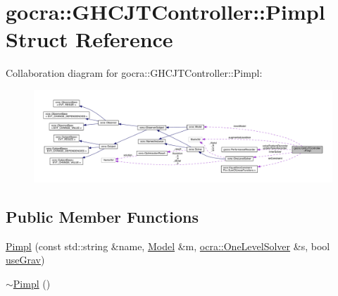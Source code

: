 \hypertarget{structgocra_1_1GHCJTController_1_1Pimpl}{}\section{gocra\+:\+:G\+H\+C\+J\+T\+Controller\+:\+:Pimpl Struct Reference}
\label{structgocra_1_1GHCJTController_1_1Pimpl}


Collaboration diagram for gocra\+:\+:G\+H\+C\+J\+T\+Controller\+:\+:Pimpl\+:\nopagebreak
\begin{figure}[H]
\begin{center}
\leavevmode
\includegraphics[width=350pt]{dd/d76/structgocra_1_1GHCJTController_1_1Pimpl__coll__graph}
\end{center}
\end{figure}
\subsection*{Public Member Functions}
\begin{DoxyCompactItemize}
\item 
\hyperlink{structgocra_1_1GHCJTController_1_1Pimpl_ad9ff86db7b59559d42a4d87eee73c761}{Pimpl} (const std\+::string \&name, \hyperlink{classocra_1_1Model}{Model} \&m, \hyperlink{classocra_1_1OneLevelSolver}{ocra\+::\+One\+Level\+Solver} \&s, bool \hyperlink{structgocra_1_1GHCJTController_1_1Pimpl_a0a9b1d16fc029929004e00dbf358063a}{use\+Grav})
\item 
\hyperlink{structgocra_1_1GHCJTController_1_1Pimpl_a0df04a7ffd9f5bc6346fc786d1c30ef1}{$\sim$\+Pimpl} ()
\end{DoxyCompactItemize}
